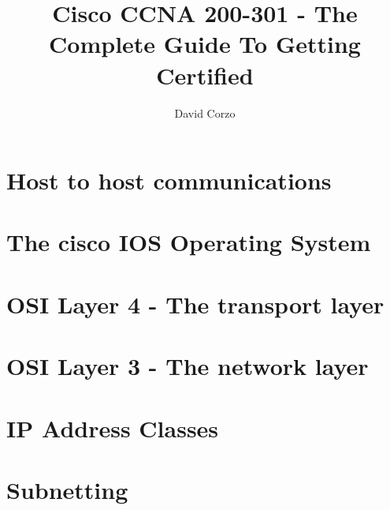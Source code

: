 \documentclass[openany]{book}
\title{\Huge Cisco CCNA 200-301 - The Complete Guide To Getting Certified}
\date{} %
\author{David Corzo}
\begin{document}
\maketitle 
\tableofcontents

\chapter{Host to host communications}


\chapter{The cisco IOS Operating System}


\chapter{OSI Layer 4 - The transport layer}


\chapter{OSI Layer 3 - The network layer}


\chapter{IP Address Classes}


\chapter{Subnetting}


\end{document}
